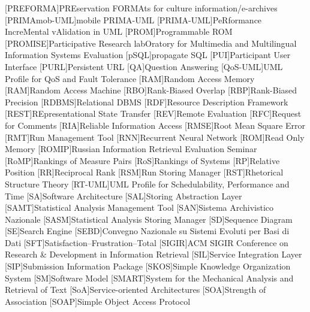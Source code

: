 [PREFORMA]{PREservation FORMAts for culture information/e-archives}
[PRIMAmob-UML]{mobile \acs{PRIMA-UML}}
[PRIMA-UML]{PeRformance IncreMental vAlidation in \acs{UML}}
[PROM]{Programmable \acs{ROM}}
[PROMISE]{Participative Research labOratory  for Multimedia and Multilingual Information Systems Evaluation}
[pSQL]{propagate \acs{SQL}}
[PUI]{Participant User Interface}
[PURL]{Persistent \acs{URL}}
[QA]{Question Answering}
[QoS-UML]{\acs{UML} Profile for QoS and Fault Tolerance}
[RAM]{Random Access Memory}
[RAM]{Random Access Machine}
[RBO]{Rank-Biased Overlap}
[RBP]{Rank-Biased Precision}
[RDBMS]{Relational \acs{DBMS}}
[RDF]{Resource Description Framework}
[REST]{REpresentational State Transfer}
[REV]{Remote Evaluation}
[RFC]{Request for Comments}
[RIA]{Reliable Information Access}
[RMSE]{Root Mean Square Error}
[RMT]{Run Management Tool}
[RNN]{Recurrent Neural Network}
[ROM]{Read Only Memory}
[ROMIP]{Russian Information Retrieval Evaluation Seminar}
[RoMP]{Rankings of Measure Pairs}
[RoS]{Rankings of Systems}
[RP]{Relative Position}
[RR]{Reciprocal Rank}
[RSM]{Run Storing Manager}
[RST]{Rhetorical Structure Theory}
[RT-UML]{\acs{UML} Profile for Schedulability, Performance and Time}
[SA]{Software Architecture}
[SAL]{Storing Abstraction Layer}
[SAMT]{Statistical Analysis Management Tool}
[SAN]{Sistema Archivistico Nazionale}
[SASM]{Statistical Analysis Storing Manager}
[SD]{Sequence Diagram}
[SE]{Search Engine}
[SEBD]{Convegno Nazionale su Sistemi Evoluti per Basi di Dati}
[SFT]{Satisfaction--Frustration--Total}
[SIGIR]{ACM SIGIR Conference on Research \& Development in Information Retrieval}
[SIL]{Service Integration Layer}
[SIP]{Submission Information Package}
[SKOS]{Simple Knowledge Organization System}
[SM]{Software Model}
[SMART]{System for the Mechanical Analysis and Retrieval of Text}
[SoA]{Service-oriented Architectures}
[SOA]{Strength of Association}
[SOAP]{Simple Object Access Protocol}
